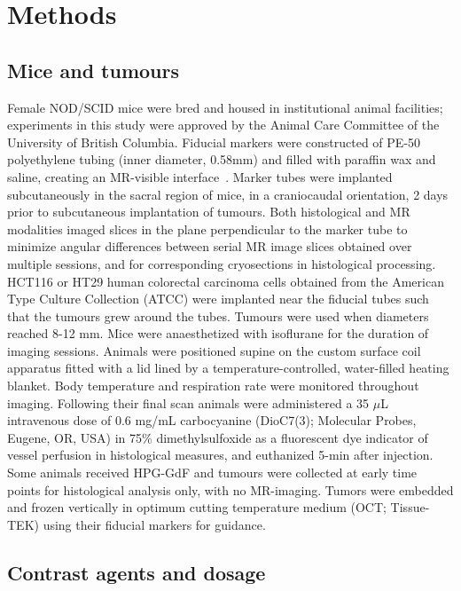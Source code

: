 \section{Methods}

\subsection{Mice and tumours}

Female NOD/SCID mice were bred and housed in institutional animal facilities; experiments in this study were approved by the Animal Care Committee of the University of British Columbia.
Fiducial markers were constructed of PE-50 polyethylene tubing (inner diameter, 0.58mm) and filled with paraffin wax and saline, creating an MR-visible interface~\cite{Bains:2009hh}.
Marker tubes were implanted subcutaneously in the sacral region of mice, in a craniocaudal orientation, 2 days prior to subcutaneous implantation of tumours.
Both histological and MR modalities imaged slices in the plane perpendicular to the marker tube to minimize angular differences between serial MR image slices obtained over multiple sessions, and for corresponding cryosections in histological processing.
HCT116 or HT29 human colorectal carcinoma cells obtained from the American Type Culture Collection (ATCC) were implanted near the fiducial tubes such that the tumours grew around the tubes.
Tumours were used when diameters reached 8-12 mm.
Mice were anaesthetized with isoflurane for the duration of imaging sessions.
Animals were positioned supine on the custom surface coil apparatus fitted with a lid lined by a temperature-controlled, water-filled heating blanket.
Body temperature and respiration rate were monitored throughout imaging.
Following their final scan animals were administered a 35 $\mu$L intravenous dose of 0.6 mg/mL carbocyanine (DioC7(3); Molecular Probes, Eugene, OR, USA) in 75\% dimethylsulfoxide as a fluorescent dye indicator of vessel perfusion in histological measures, and euthanized 5-min after injection.
Some animals received \acs{HPG-GdF} and tumours were collected at early time points for histological analysis only, with no MR-imaging.
Tumors were embedded and frozen vertically in optimum cutting temperature medium (OCT; Tissue-TEK) using their fiducial markers for guidance.

\subsection{Contrast agents and dosage}

